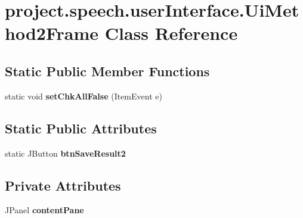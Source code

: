 \section{project.\+speech.\+user\+Interface.\+Ui\+Method2\+Frame Class Reference}
\label{classproject_1_1speech_1_1user_interface_1_1_ui_method2_frame}
\subsection*{Static Public Member Functions}
\begin{DoxyCompactItemize}
\item 
static void {\bf set\+Chk\+All\+False} (Item\+Event e)
\end{DoxyCompactItemize}
\subsection*{Static Public Attributes}
\begin{DoxyCompactItemize}
\item 
static J\+Button {\bf btn\+Save\+Result2}
\end{DoxyCompactItemize}
\subsection*{Private Attributes}
\begin{DoxyCompactItemize}
\item 
J\+Panel {\bf content\+Pane}
\end{DoxyCompactItemize}
